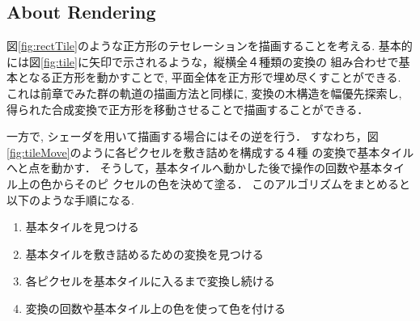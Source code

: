 \subsection{About Rendering}

図\ref{fig:rectTile}のような正方形のテセレーションを描画することを考える.
基本的には図\ref{fig:tile}に矢印で示されるような，縦横全４種類の変換の
組み合わせで基本となる正方形を動かすことで, 平面全体を正方形で埋め尽くすことができる.
これは前章でみた群の軌道の描画方法と同様に, 変換の木構造を幅優先探索し,
得られた合成変換で正方形を移動させることで描画することができる．

一方で, シェーダを用いて描画する場合にはその逆を行う．
すなわち，図\ref{fig:tileMove}のように各ピクセルを敷き詰めを構成する４種
の変換で基本タイルへと点を動かす．
そうして，基本タイルへ動かした後で操作の回数や基本タイル上の色からそのピ
クセルの色を決めて塗る．
このアルゴリズムをまとめると以下のような手順になる.
\begin{enumerate}
 \item 基本タイルを見つける
 \item 基本タイルを敷き詰めるための変換を見つける
 \item 各ピクセルを基本タイルに入るまで変換し続ける
 \item 変換の回数や基本タイル上の色を使って色を付ける
\end{enumerate}

